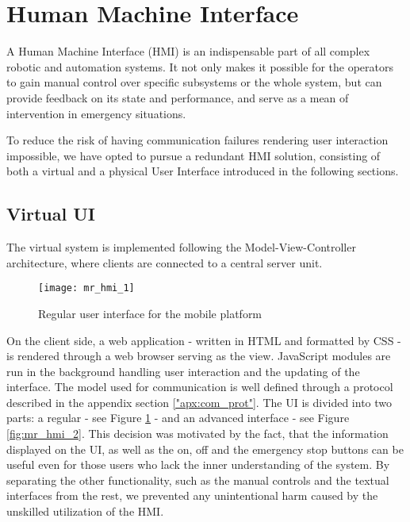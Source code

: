 \section{Human Machine Interface} %
\label{sec:mr_human_machine_interface}

A Human Machine Interface (HMI) is an indispensable part of all complex robotic and automation systems. It not only makes it possible for the operators to gain manual control over specific subsystems or the whole system, but can provide feedback on its state and performance, and serve as a mean of intervention in emergency situations.

To reduce the risk of having communication failures rendering user interaction impossible, we have opted to pursue a redundant HMI solution, consisting of both a virtual and a physical User Interface introduced in the following sections.

	\subsection{Virtual UI} %
	\label{sub:mr_web}
	
	The virtual system is implemented following the Model-View-Controller architecture, where clients are connected to a central server unit. 
	
	\begin{figure}[H]
		\centering
	    \texttt{[image: mr\_hmi\_1]}
	    \caption{Regular user interface for the mobile platform}
		\label{fig:mr_hmi_1}
	\end{figure}
	
	On the client side, a web application - written in HTML\cite{html} and formatted by CSS\cite{css} - is rendered through a web browser serving as the view. JavaScript\cite{javascript} modules are run in the background handling user interaction and the updating of the interface. The model used for communication is well defined through a protocol described in the appendix section \ref{"apx:com_prot"}. The UI is divided into two parts: a regular - see Figure \ref{fig:mr_hmi_1} - and an advanced interface - see Figure \ref{fig:mr_hmi_2}. This decision was motivated by the fact, that the information displayed on the UI, as well as the on, off and the emergency stop buttons can be useful even for those users who lack the inner understanding of the system. By separating the other functionality, such as the manual controls and the textual interfaces from the rest, we prevented any unintentional harm caused by the unskilled utilization of the HMI.
	
